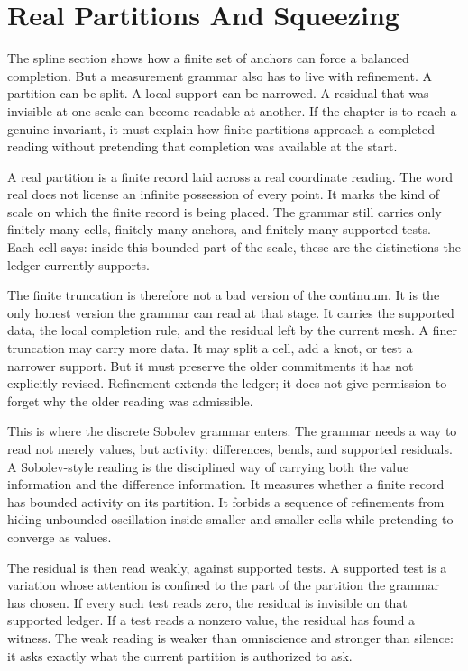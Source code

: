 \section{Real Partitions And Squeezing}

The spline section shows how a finite set of anchors can force a balanced
completion. But a measurement grammar also has to live with refinement. A
partition can be split. A local support can be narrowed. A residual that was
invisible at one scale can become readable at another. If the chapter is to
reach a genuine invariant, it must explain how finite partitions approach a
completed reading without pretending that completion was available at the
start.

A real partition is a finite record laid across a real coordinate reading.
The word real does not license an infinite possession of every point. It
marks the kind of scale on which the finite record is being placed. The
grammar still carries only finitely many cells, finitely many anchors, and
finitely many supported tests. Each cell says: inside this bounded part of
the scale, these are the distinctions the ledger currently supports.

The finite truncation is therefore not a bad version of the continuum. It
is the only honest version the grammar can read at that stage. It carries
the supported data, the local completion rule, and the residual left by the
current mesh. A finer truncation may carry more data. It may split a cell,
add a knot, or test a narrower support. But it must preserve the older
commitments it has not explicitly revised. Refinement extends the ledger; it
does not give permission to forget why the older reading was admissible.

This is where the discrete Sobolev grammar enters. The grammar needs a way
to read not merely values, but activity: differences, bends, and supported
residuals. A Sobolev-style reading is the disciplined way of carrying both
the value information and the difference information. It measures whether a
finite record has bounded activity on its partition. It forbids a sequence
of refinements from hiding unbounded oscillation inside smaller and smaller
cells while pretending to converge as values.

The residual is then read weakly, against supported tests. A supported test
is a variation whose attention is confined to the part of the partition the
grammar has chosen. If every such test reads zero, the residual is invisible
on that supported ledger. If a test reads a nonzero value, the residual has
found a witness. The weak reading is weaker than omniscience and stronger
than silence: it asks exactly what the current partition is authorized to
ask.

